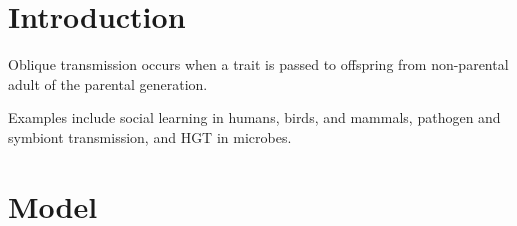 \documentclass[a0,landscape]{a0poster}
\begin{document}
\vspace{2cm} %


\begin{multicols}{4} %


%
%
%


\color{DarkSlateGray}

\section*{Introduction}

Oblique transmission occurs when a trait is passed to offspring from non-parental adult of the parental generation.

Examples include social learning in humans, birds, and mammals, pathogen and symbiont transmission, and HGT in microbes.


\section*{Model}


\end{multicols}
\end{document}
